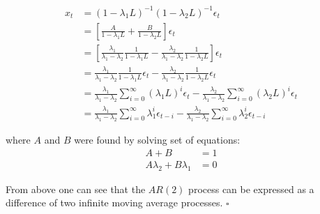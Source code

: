 \begin{solution}
\begin{equation}
\begin{aligned}
x_t  & = (1 - \lambda_1L)^{-1}(1-\lambda_2L)^{-1}\epsilon_t \\
     & = \left[\frac{A}{1 - \lambda_1L} + \frac{B}{1 - \lambda_2L}\right]\epsilon_t \\
		 & = \left[\frac{\lambda_1}{\lambda_1 - \lambda_2}\frac{1}{1 - \lambda_1L} 
		   - \frac{\lambda_2}{\lambda_1 - \lambda_2}\frac{1}{1 - \lambda_2L}\right]\epsilon_t \\
		 & = \frac{\lambda_1}{\lambda_1 - \lambda_2}\frac{1}{1 - \lambda_1L}\epsilon_t 
		   - \frac{\lambda_2}{\lambda_1 - \lambda_2}\frac{1}{1 - \lambda_2L}\epsilon_t \\
		 & = \frac{\lambda_1}{\lambda_1 - \lambda_2}\sum_{i=0}^{\infty} (\lambda_1L)^i \epsilon_t 
		   - \frac{\lambda_2}{\lambda_1 - \lambda_2}\sum_{i=0}^{\infty} (\lambda_2L)^i \epsilon_t \\
		 & = \frac{\lambda_1}{\lambda_1 - \lambda_2}\sum_{i=0}^{\infty} \lambda_1^i \epsilon_{t-i} 
		   - \frac{\lambda_2}{\lambda_1 - \lambda_2}\sum_{i=0}^{\infty} \lambda_2^i \epsilon_{t-i}
\end{aligned}
\end{equation}

where $A$ and $B$ were found by solving set of equations:
\nonumber
\begin{equation}
\begin{aligned}
                    A+B & = 1 \\
A\lambda_2 + B\lambda_1 & = 0
\end{aligned}
\end{equation}

From above one can see that the $AR(2)$ process can be expressed as a difference of two infinite moving average processes. $\square$

\end{solution}